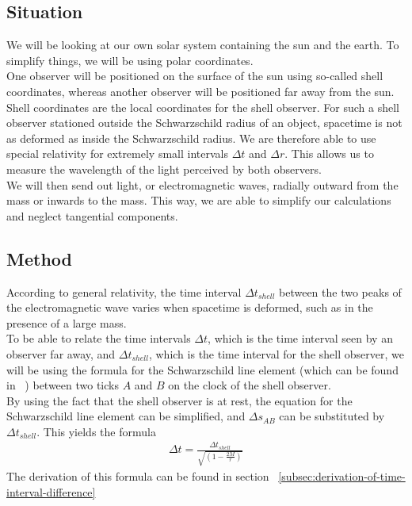 \documentclass[reprint,english,notitlepage]{revtex4-2}
\begin{document}
    \subsection{Situation}\label{subsec:situation1}
        We will be looking at our own solar system containing the sun and the earth.
        To simplify things, we will be using polar coordinates.\\
        One observer will be positioned on the surface of the sun using so-called shell coordinates, whereas another observer will be positioned far away from the sun.
        Shell coordinates are the local coordinates for the shell observer.
        For such a shell observer stationed outside the Schwarzschild radius of an object, spacetime is not as deformed as inside the Schwarzschild radius.
        We are therefore able to use special relativity for extremely small intervals $\Delta t$ and $\Delta r$.
        This allows us to measure the wavelength of the light perceived by both observers.\\
        We will then send out light, or electromagnetic waves, radially outward from the mass or inwards to the mass.
        This way, we are able to simplify our calculations and neglect tangential components.

    \subsection{Method}\label{subsec:method1}
        According to general relativity, the time interval $\Delta t_{shell}$ between the two peaks of the electromagnetic wave varies when spacetime is deformed, such as in the presence of a large mass.\\
        To be able to relate the time intervals $\Delta t$, which is the time interval seen by an observer far away, and $\Delta t_{shell}$, which is the time interval for the shell observer, we will be using the formula for the Schwarzschild line element (which can be found in ~\parencite[][]{lecture2c}) between two ticks $A$ and $B$ on the clock of the shell observer.\\

        By using the fact that the shell observer is at rest, the equation for the Schwarzschild line element can be simplified, and $\Delta s_{AB}$ can be substituted by $\Delta t_{shell}$.
        This yields the formula
        \begin{align}
                \Delta t = \frac{\Delta t_{shell}}{\sqrt{\left(1-\frac{2M}{r}\right)}} \label{eq2}
        \end{align}
        The derivation of this formula can be found in section ~\ref{subsec:derivation-of-time-interval-difference}\\\\
\end{document}
